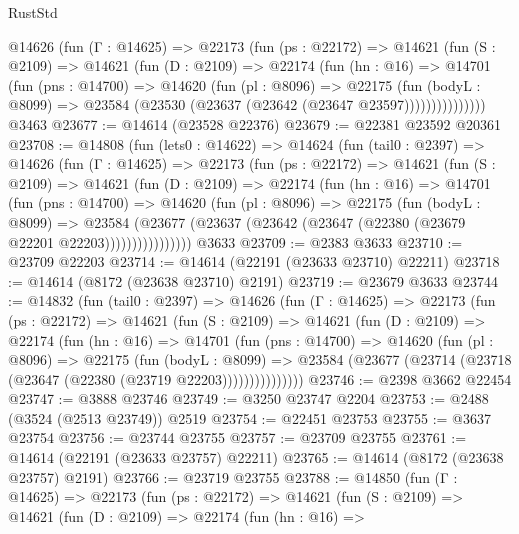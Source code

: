 \begin{lexlean}{RustStd}
\begin{coremodule}
        @14626
          (fun (Γ : @14625) =>
          @22173
            (fun (ps : @22172) =>
            @14621
              (fun (S : @2109) =>
              @14621
                (fun (D : @2109) =>
                @22174
                  (fun (hn : @16) =>
                  @14701
                    (fun (pns : @14700) =>
                    @14620
                      (fun (pl : @8096) =>
                      @22175
                        (fun (bodyL : @8099) =>
                        @23584 (@23530 (@23637 (@23642 (@23647 @23597)))))))))))))))
    @3463
@23677 := @14614 (@23528 @22376)
@23679 := @22381 @23592 @20361
@23708 := @14808
    (fun (lets0 : @14622) =>
    @14624
      (fun (tail0 : @2397) =>
      @14626
        (fun (Γ : @14625) =>
        @22173
          (fun (ps : @22172) =>
          @14621
            (fun (S : @2109) =>
            @14621
              (fun (D : @2109) =>
              @22174
                (fun (hn : @16) =>
                @14701
                  (fun (pns : @14700) =>
                  @14620
                    (fun (pl : @8096) =>
                    @22175
                      (fun (bodyL : @8099) =>
                      @23584
                        (@23677
                          (@23637 (@23642 (@23647 (@22380 (@23679 @22201 @22203))))))))))))))))
    @3633
@23709 := @2383 @3633
@23710 := @23709 @22203
@23714 := @14614 (@22191 (@23633 @23710) @22211)
@23718 := @14614 (@8172 (@23638 @23710) @2191)
@23719 := @23679 @3633
@23744 := @14832
    (fun (tail0 : @2397) =>
    @14626
      (fun (Γ : @14625) =>
      @22173
        (fun (ps : @22172) =>
        @14621
          (fun (S : @2109) =>
          @14621
            (fun (D : @2109) =>
            @22174
              (fun (hn : @16) =>
              @14701
                (fun (pns : @14700) =>
                @14620
                  (fun (pl : @8096) =>
                  @22175
                    (fun (bodyL : @8099) =>
                    @23584 (@23677 (@23714 (@23718 (@23647 (@22380 (@23719 @22203)))))))))))))))
@23746 := @2398 @3662 @22454
@23747 := @3888 @23746
@23749 := @3250 @23747 @2204
@23753 := @2488 (@3524 (@2513 @23749)) @2519
@23754 := @22451 @23753
@23755 := @3637 @23754
@23756 := @23744 @23755
@23757 := @23709 @23755
@23761 := @14614 (@22191 (@23633 @23757) @22211)
@23765 := @14614 (@8172 (@23638 @23757) @2191)
@23766 := @23719 @23755
@23788 := @14850
    (fun (Γ : @14625) =>
    @22173
      (fun (ps : @22172) =>
      @14621
        (fun (S : @2109) =>
        @14621
          (fun (D : @2109) =>
          @22174
            (fun (hn : @16) =>

\end{coremodule}
\end{lexlean}
